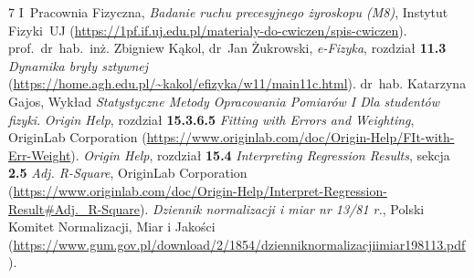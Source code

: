 \documentclass[twocolumn, a4paper, polish, 10pt]{article}
\begin{document}
\begin{thebibliography}{7}
 I~Pracownia Fizyczna, \emph{Badanie ruchu precesyjnego żyroskopu (M8)}, Instytut Fizyki~UJ (\url{https://1pf.if.uj.edu.pl/materialy-do-cwiczen/spis-cwiczen}).
 prof.~dr~hab.~inż. \mbox{Zbigniew} \mbox{Kąkol}, \mbox{dr~Jan} \mbox{Żukrowski}, \emph{e-Fizyka}, rozdział \textbf{11.3} \emph{Dynamika bryły sztywnej} (\url{https://home.agh.edu.pl/~kakol/efizyka/w11/main11c.html}).
 dr~hab. \mbox{Katarzyna} \mbox{Gajos}, Wykład \emph{Statystyczne Metody Opracowania Pomiarów I Dla studentów fizyki}.
 \emph{Origin Help}, rozdział \textbf{15.3.6.5} \emph{Fitting with Errors and Weighting}, OriginLab Corporation (\url{https://www.originlab.com/doc/Origin-Help/FIt-with-Err-Weight}).
 \emph{Origin Help}, rozdział \textbf{15.4} \emph{Interpreting Regression Results}, sekcja \textbf{2.5} \emph{Adj. R-Square}, OriginLab Corporation (\url{https://www.originlab.com/doc/Origin-Help/Interpret-Regression-Result#Adj._R-Square}).
 \emph{Dziennik normalizacji i miar nr 13/81 r.}, Polski Komitet Normalizacji, Miar i Jakości (\url{https://www.gum.gov.pl/download/2/1854/dzienniknormalizacjiimiar198113.pdf}).

\end{thebibliography}
\end{document}
